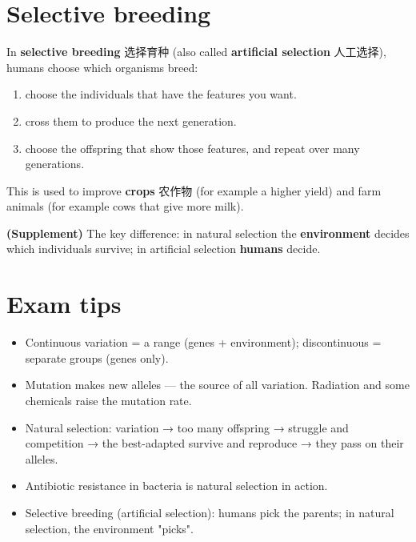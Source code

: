 \documentclass[11pt]{article}
\begin{document}
\section*{Selective breeding}

In \textbf{selective breeding} 选择育种 (also called \textbf{artificial selection} 人工选择), humans choose which organisms breed:

\begin{enumerate}
\item choose the individuals that have the features you want.

\item cross them to produce the next generation.

\item choose the offspring that show those features, and repeat over many generations.

\end{enumerate}

This is used to improve \textbf{crops} 农作物 (for example a higher yield) and farm animals (for example cows that give more milk).

\textbf{(Supplement)} The key difference: in natural selection the \textbf{environment} decides which individuals survive; in artificial selection \textbf{humans} decide.

\section*{Exam tips}

\begin{itemize}
\item Continuous variation = a range (genes + environment); discontinuous = separate groups (genes only).

\item Mutation makes new alleles — the source of all variation. Radiation and some chemicals raise the mutation rate.

\item Natural selection: variation → too many offspring → struggle and competition → the best-adapted survive and reproduce → they pass on their alleles.

\item Antibiotic resistance in bacteria is natural selection in action.

\item Selective breeding (artificial selection): humans pick the parents; in natural selection, the environment "picks".

\end{itemize}
\end{document}

